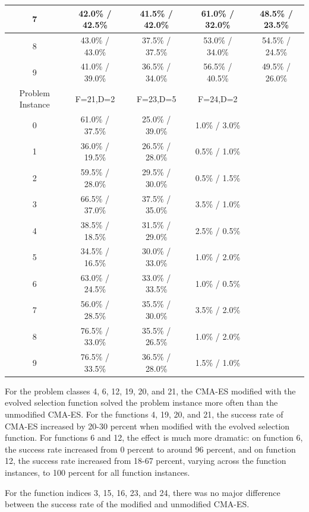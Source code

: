 \documentclass[sigconf]{acmart}
\begin{document}
\begin{table}
\begin{tabular}{c|c|c|c|c}
		\hline
		7 & 42.0\% / 42.5\% & 41.5\% / 42.0\% & 61.0\% / 32.0\% & 48.5\% / 23.5\%\\
		\hline
		8 & 43.0\% / 43.0\% & 37.5\% / 37.5\% & 53.0\% / 34.0\% & 54.5\% / 24.5\%\\
		\hline
		9 & 41.0\% / 39.0\% & 36.5\% / 34.0\% & 56.5\% / 40.5\% & 49.5\% / 26.0\%\\
		\hline
		\hline
		Problem Instance & F=21,D=2 & F=23,D=5 & F=24,D=2\\
		\hline
		0 & 61.0\% / 37.5\% & 25.0\% / 39.0\% & 1.0\% / 3.0\%& \\
		\hline
		1 & 36.0\% / 19.5\% & 26.5\% / 28.0\% & 0.5\% / 1.0\%& \\
		\hline
		2 & 59.5\% / 28.0\% & 29.5\% / 30.0\% & 0.5\% / 1.5\%& \\
		\hline
		3 & 66.5\% / 37.0\% & 37.5\% / 35.0\% & 3.5\% / 1.0\%& \\
		\hline
		4 & 38.5\% / 18.5\% & 31.5\% / 29.0\% & 2.5\% / 0.5\%& \\
		\hline
		5 & 34.5\% / 16.5\% & 30.0\% / 33.0\% & 1.0\% / 2.0\%& \\
		\hline
		6 & 63.0\% / 24.5\% & 33.0\% / 33.5\% & 1.0\% / 0.5\%& \\
		\hline
		7 & 56.0\% / 28.5\% & 35.5\% / 30.0\% & 3.5\% / 2.0\%& \\
		\hline
		8 & 76.5\% / 33.0\% & 35.5\% / 26.5\% & 1.0\% / 2.0\%& \\
		\hline
		9 & 76.5\% / 33.5\% & 36.5\% / 28.0\% & 1.5\% / 1.0\%& \\
		
		\bottomrule
	\end{tabular}
\end{table}

For the problem classes 4, 6, 12, 19, 20, and 21, the CMA-ES modified with the evolved selection function solved the problem instance more often than the unmodified CMA-ES. For the functions 4, 19, 20, and 21, the success rate of CMA-ES increased by 20-30 percent when modified with the evolved selection function. For functions 6 and 12, the effect is much more dramatic: on function 6, the success rate increased from 0 percent to around 96 percent, and on function 12, the success rate increased from 18-67 percent, varying across the function instances, to 100 percent for all function instances.

For the function indices 3, 15, 16, 23, and 24, there was no major difference between the success rate of the modified and unmodified CMA-ES.
\end{document}
